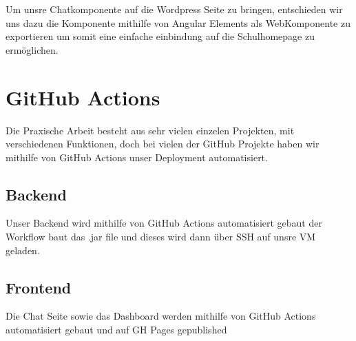 Um unsre Chatkomponente auf die Wordpress Seite zu bringen, entschieden wir uns dazu die Komponente mithilfe von Angular Elements als WebKomponente zu exportieren um somit eine einfache einbindung auf die Schulhomepage zu ermöglichen.

\section{GitHub Actions}

Die Praxische Arbeit besteht aus sehr vielen einzelen Projekten, mit verschiedenen Funktionen, doch bei vielen der GitHub Projekte haben wir mithilfe von GitHub Actions unser Deployment automatisiert.

\subsection{Backend}

Unser Backend wird mithilfe von GitHub Actions automatisiert gebaut der Workflow baut das .jar file und dieses wird dann über SSH auf unsre VM geladen.

\subsection{Frontend}
Die Chat Seite sowie das Dashboard werden mithilfe von GitHub Actions automatisiert gebaut und auf GH Pages gepublished

